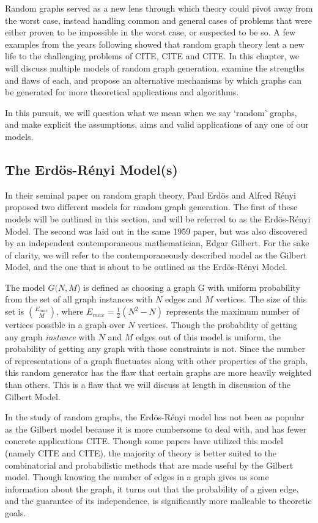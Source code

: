 \documentclass[11pt,a4paper]{report}
\begin{document}
Random graphs served as a new lens through which theory could pivot away from the worst case, instead handling common and general cases of problems that were either proven to be impossible in the worst case, or suspected to be so. 
A few examples from the years following showed that random graph theory lent a new life to the challenging problems of CITE, CITE and CITE.
In this chapter, we will discuss multiple models of random graph generation, examine the strengths and flaws of each, and propose an alternative mechanisms by which graphs can be generated for more theoretical applications and algorithms.

In this pursuit, we will question what we mean when we say `random' graphs, and make explicit the assumptions, aims and valid applications of any one of our models. 

\subsection{The Erd\"os-R\'enyi Model(s)}

In their seminal paper on random graph theory, Paul Erd\"os and Alfred R\'enyi proposed two different models for random graph generation.
The first of these models will be outlined in this section, and will be referred to as the Erd\"os-R\'enyi Model.
The second was laid out in the same 1959 paper, but was also discovered by an independent contemporaneous mathematician, Edgar Gilbert.
For the sake of clarity, we will refer to the contemporaneously described model as the Gilbert Model, and the one that is about to be outlined as the Erd\"os-R\'enyi Model.

The model $G(N, M$) is defined as choosing a graph G with uniform probability from the set of all graph instances with $N$ edges and $M$ vertices.
The size of this set is $\binom{E_{max}}{M}$, where $E_{max} = \frac{1}{2}(N^2 - N)$ represents the maximum number of vertices possible in a graph over $N$ vertices.
Though the probability of getting any graph \emph{instance} with $N$ and $M$ edges out of this model is uniform, the probability of getting any graph with those constraints is not.
Since the number of representations of a graph fluctuates along with other properties of the graph, this random generator has the flaw that certain graphs are more heavily weighted than others.
This is a flaw that we will discuss at length in discussion of the Gilbert Model.

In the study of random graphs, the Erd\"os-R\'enyi model has not been as popular as the Gilbert model because it is more cumbersome to deal with, and has fewer concrete applications CITE.
Though some papers have utilized this model (namely CITE and CITE), the majority of theory is better suited to the combinatorial and probabilistic methods that are made useful by the Gilbert model.
Though knowing the number of edges in a graph gives us some information about the graph, it turns out that the probability of a given edge, and the guarantee of its independence, is significantly more malleable to theoretic goals.
\end{document}
